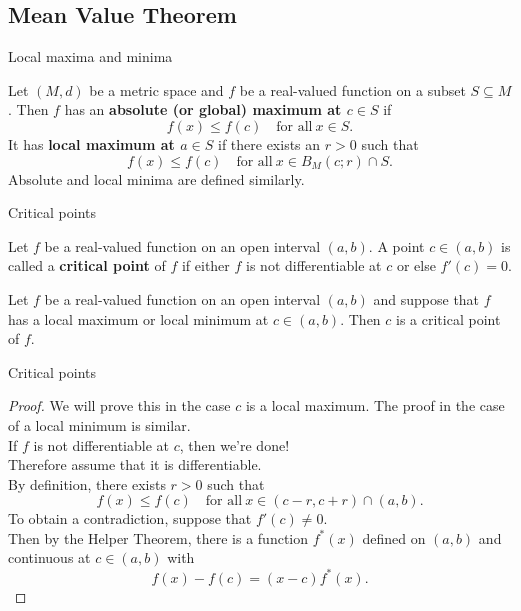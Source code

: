 \documentclass{beamer}
\begin{document}
\subsection{Mean Value Theorem}

\begin{frame}{Local maxima and minima}
\begin{defn}
Let $(M,d)$ be a metric space and $f$ be a real-valued function on a subset $S\subseteq M$.
\pause
Then $f$ has an \textbf{absolute (or global) maximum at $c\in S$} if
$$f(x)\leq f(c)\quad\text{for all}\ x\in S.$$
\pause
It has \textbf{local maximum at $a\in S$} if there exists an $r>0$ such that
$$f(x)\leq f(c)\quad\text{for all}\ x\in B_M(c;r)\cap S.$$
\pause
Absolute and local minima are defined similarly.
\end{defn}
\end{frame}

\begin{frame}{Critical points}
\begin{defn}
Let $f$ be a real-valued function on an open interval $(a,b)$.
\pause
A point $c\in (a,b)$ is called a \textbf{critical point} of $f$ if either $f$ is not differentiable at $c$ or else $f'(c) = 0$.
\end{defn}
\pause
\begin{thm}
Let $f$ be a real-valued function on an open interval $(a,b)$ and suppose that $f$ has a local maximum or local minimum at $c\in (a,b)$.
Then $c$ is a critical point of $f$.
\end{thm}
\end{frame}

\begin{frame}{Critical points}
\begin{proof}
\pause
We will prove this in the case $c$ is a local maximum.  The proof in the case of a local minimum is similar.\\
\pause
If $f$ is not differentiable at $c$, then we're done!\\
\pause
Therefore assume that it is differentiable.\\
\pause
By definition, there exists $r>0$ such that
$$f(x)\leq f(c)\quad\text{for all}\ x\in (c-r,c+r)\cap (a,b).$$
\pause
To obtain a contradiction, suppose that $f'(c)\neq 0$.\\
\pause
Then by the Helper Theorem, there is a function $f^*(x)$ defined on $(a,b)$ and continuous at $c\in (a,b)$ with
$$f(x)-f(c) = (x-c)f^*(x).$$
\end{proof}
\end{frame}
\end{document}

